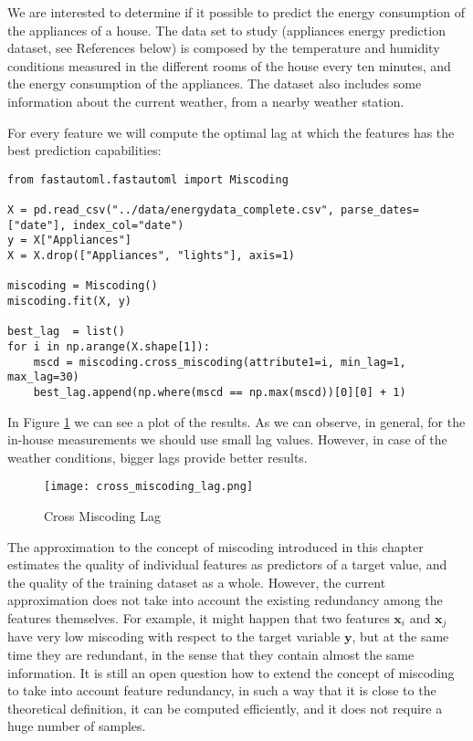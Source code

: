 \begin{example}
We are interested to determine if it possible to predict the energy consumption of the appliances of a house. The data set to study (appliances energy prediction dataset, see References below) is composed by the temperature and humidity conditions measured in the different rooms of the house every ten minutes, and the energy consumption of the appliances. The dataset also includes some information about the current weather, from a nearby weather station.

For every feature we will compute the optimal lag at which the features has the best prediction capabilities:

\begin{sourcecode}
{\scriptsize \begin{verbatim}
from fastautoml.fastautoml import Miscoding

X = pd.read_csv("../data/energydata_complete.csv", parse_dates=["date"], index_col="date")
y = X["Appliances"]
X = X.drop(["Appliances", "lights"], axis=1)

miscoding = Miscoding()
miscoding.fit(X, y)

best_lag  = list()
for i in np.arange(X.shape[1]):
    mscd = miscoding.cross_miscoding(attribute1=i, min_lag=1, max_lag=30)
    best_lag.append(np.where(mscd == np.max(mscd))[0][0] + 1)
\end{verbatim}}
\end{sourcecode}

In Figure \ref{figure:cross-miscoding} we can see a plot of the results. As we can observe, in general, for the in-house measurements we should use small lag values. However, in case of the weather conditions, bigger lags provide better results.

\begin{figure}[h]
\centering
\texttt{[image: cross\_miscoding\_lag.png]}
\caption{Cross Miscoding Lag}
\label{figure:cross-miscoding}
\end{figure}

\end{example}

\begin{remark}
The approximation to the concept of miscoding introduced in this chapter estimates the quality of individual features as predictors of a target value, and the quality of the training dataset as a whole. However, the current approximation does not take into account the existing redundancy among the features themselves. For example, it might happen that two features $\mathbf{x}_i$ and $\mathbf{x}_j$ have very low miscoding with respect to the target variable $\mathbf{y}$, but at the same time they are redundant, in the sense that they contain almost the same information. It is still an open question how to extend the concept of miscoding to take into account feature redundancy, in such a way that it is close to the theoretical definition, it can be computed efficiently, and it does not require a huge number of samples.
\end{remark}

